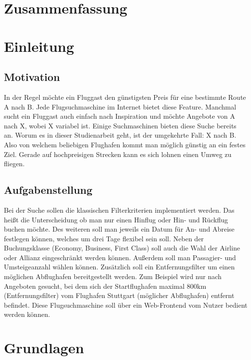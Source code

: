 \documentclass[12pt,twoside,a4paper]{article}
\begin{document}
\section*{Zusammenfassung}
\newpage
\tableofcontents
\newpage
\listoffigures
\newpage
\printglossary[type=\acronymtype]
\printglossary
\newpage
{}
\setcounter{page}{1}
\section{Einleitung}
\subsection{Motivation}
In der Regel möchte ein Fluggast den günstigsten Preis für eine bestimmte Route A nach B. Jede Flugsuchmaschine im Internet bietet diese Feature. Manchmal sucht ein Fluggast auch einfach nach Inspiration und möchte Angebote von A nach X, wobei X variabel ist. Einige Suchmaschinen bieten diese Suche bereits an. Worum es in dieser Studienarbeit geht, ist der umgekehrte Fall: X nach B. Also von welchem beliebigen Flughafen kommt man möglich günstig an ein festes Ziel.\newline
Gerade auf hochpreisigen Strecken kann es sich lohnen einen Umweg zu fliegen.
\subsection{Aufgabenstellung}
Bei der Suche sollen die klassischen Filterkriterien implementiert werden. Das heißt die Unterscheidung ob man nur einen Hinflug oder Hin- und Rückflug buchen möchte. Des weiteren soll man jeweils ein Datum für An- und Abreise festlegen können, welches um drei Tage flexibel sein soll. Neben der Buchungsklasse (Economy, Business, First Class) soll auch die Wahl der Airline oder Allianz eingeschränkt werden können. Außerdem soll man Passagier- und Umsteigeanzahl wählen können.\newline
Zusätzlich soll ein Entfernungsfilter um einen möglichen Abflughafen bereitgestellt werden. Zum Beispiel wird nur nach Angeboten gesucht, bei dem sich der Startflughafen maximal 800km (Entfernungsfilter) vom Flughafen Stuttgart (möglicher Abflughafen) entfernt befindet.\newline
Diese Flugsuchmaschine soll über ein Web-Frontend vom Nutzer bedient werden können. \cite{example}
\section{Grundlagen}
\end{document}
